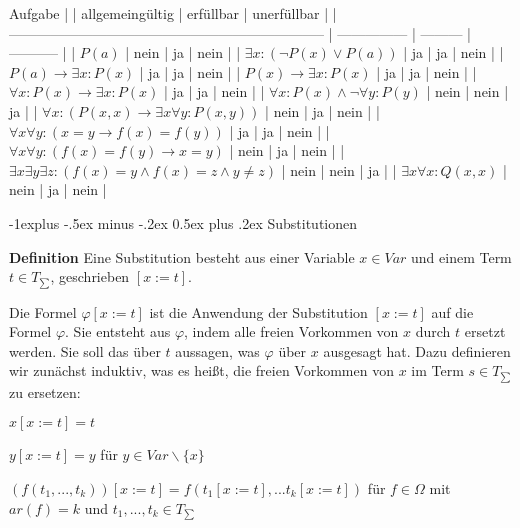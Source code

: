 \documentclass[a4paper]{article}
\makeatletter
\renewcommand{\note}[2]{\begin{noteBox} \textbf{#1} #2 \end{noteBox}}
\renewcommand{\subsection}{\@startsection{subsection}{2}{0mm}%
                {-1explus -.5ex minus -.2ex}%
                {0.5ex plus .2ex}%
                {\normalfont\normalsize\bfseries}}
\makeatother
\begin{document}
\begin{multicols}{3}
  Aufgabe
  |                                                                      | allgemeingültig | erfüllbar | unerfüllbar |
  | -------------------------------------------------------------------- | --------------- | --------- | ----------- |
  | $P(a)$                                                               | nein            | ja        | nein        |
  | $\exists x:(\lnot P(x)\vee P(a))$                                    | ja              | ja        | nein        |
  | $P(a)\rightarrow\exists x:P(x)$                                      | ja              | ja        | nein        |
  | $P(x)\rightarrow\exists x:P(x)$                                      | ja              | ja        | nein        |
  | $\forall x:P(x)\rightarrow\exists x:P(x)$                            | ja              | ja        | nein        |
  | $\forall x:P(x)\wedge\lnot\forall y:P(y)$                            | nein            | nein      | ja          |
  | $\forall x:(P(x,x)\rightarrow\exists x\forall y:P(x,y))$             | nein            | ja        | nein        |
  | $\forall x\forall y:(x=y\rightarrow f(x) =f(y))$                     | ja              | ja        | nein        |
  | $\forall x\forall y:(f(x) =f(y)\rightarrow x=y)$                     | nein            | ja        | nein        |
  | $\exists x\exists y\exists z:(f(x) =y\wedge f(x) =z\wedge y \not=z)$ | nein            | nein      | ja          |
  | $\exists x\forall x:Q(x,x)$                                          | nein            | ja        | nein        |

  \subsection{Substitutionen}
  \note{Definition}{Eine Substitution besteht aus einer Variable $x\in Var$ und einem Term $t\in T_{\sum}$, geschrieben $[x:=t]$.}

  Die Formel $\varphi[x:=t]$ ist die Anwendung der Substitution $[x:=t]$ auf die Formel $\varphi$. Sie entsteht aus $\varphi$, indem alle freien Vorkommen von $x$ durch $t$ ersetzt werden. Sie soll das über $t$ aussagen, was $\varphi$ über $x$ ausgesagt hat.
  Dazu definieren wir zunächst induktiv, was es heißt, die freien Vorkommen von $x$ im Term $s\in T_{\sum}$ zu ersetzen:
  \begin{itemize*}
    \item $x[x:=t] =t$
    \item $y[x:=t] =y$ für $y\in Var\backslash\{x\}$
    \item $(f(t_1 ,...,t_k))[x:=t] =f(t_1 [x:=t],...t_k[x:=t])$ für $f\in\Omega$ mit $ar(f) =k$ und $t_1,...,t_k\in T_{\sum}$
  \end{itemize*}


\end{multicols}
\end{document}
